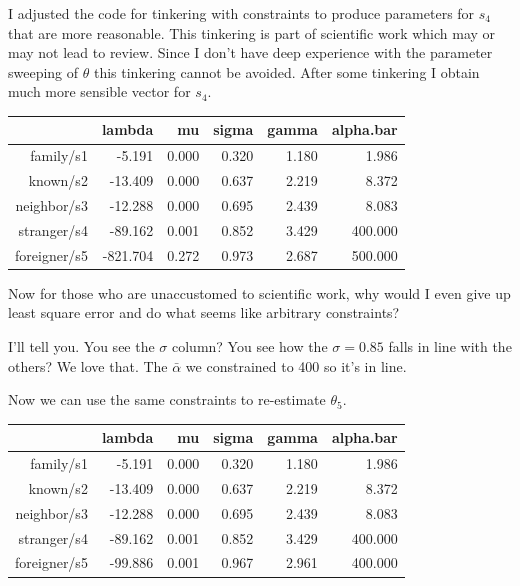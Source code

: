 \documentclass{amsart}
\begin{document}
I adjusted the code for tinkering with constraints to produce parameters for $s_4$ that are more reasonable.  This tinkering is part of scientific work which may or may not lead to review.  Since I don't have deep experience with the parameter sweeping of $\theta$ this tinkering cannot be avoided.  After some tinkering I obtain much more sensible vector for $s_4$.

\begin{table}[ht]
\centering
\begin{tabular}{rrrrrr}
  \hline
 & lambda & mu & sigma & gamma & alpha.bar \\ 
  \hline
family/s1 & -5.191 & 0.000 & 0.320 & 1.180 & 1.986 \\ 
  known/s2 & -13.409 & 0.000 & 0.637 & 2.219 & 8.372 \\ 
  neighbor/s3 & -12.288 & 0.000 & 0.695 & 2.439 & 8.083 \\ 
  stranger/s4 & -89.162 & 0.001 & 0.852 & 3.429 & 400.000 \\ 
  foreigner/s5 & -821.704 & 0.272 & 0.973 & 2.687 & 500.000 \\ 
   \hline
\end{tabular}
\end{table}
\pagebreak

Now for those who are unaccustomed to scientific work, why would I even give up least square error and do what seems like arbitrary constraints?

I'll tell you.  You see the $\sigma$ column?  You see how the $\sigma=0.85$ falls in line with the others?  We love that. The $\bar{\alpha}$ we constrained to 400 so it's in line.  

Now we can use the same constraints to re-estimate $\theta_5$.  

\begin{table}[ht]
\centering
\begin{tabular}{rrrrrr}
  \hline
 & lambda & mu & sigma & gamma & alpha.bar \\ 
  \hline
family/s1 & -5.191 & 0.000 & 0.320 & 1.180 & 1.986 \\ 
  known/s2 & -13.409 & 0.000 & 0.637 & 2.219 & 8.372 \\ 
  neighbor/s3 & -12.288 & 0.000 & 0.695 & 2.439 & 8.083 \\ 
  stranger/s4 & -89.162 & 0.001 & 0.852 & 3.429 & 400.000 \\ 
  foreigner/s5 & -99.886 & 0.001 & 0.967 & 2.961 & 400.000 \\ 
   \hline
\end{tabular}
\end{table}
\end{document}
